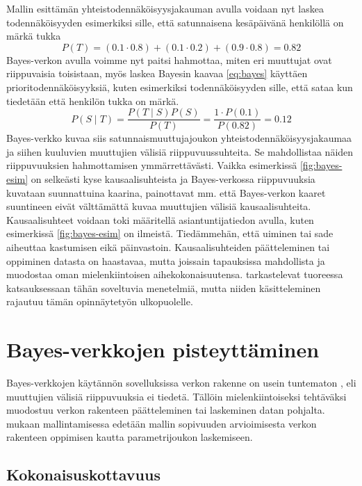 Mallin esittämän yhteistodennäköisyysjakauman avulla voidaan nyt laskea todennäköisyyden esimerkiksi sille, että satunnaisena kesäpäivänä henkilöllä on märkä tukka 
$$ 
    P(T) = (0.1\cdot0.8) + (0.1\cdot0.2) + (0.9\cdot0.8) = 0.82 
$$ 
Bayes-verkon avulla voimme nyt paitsi hahmottaa, miten eri muuttujat ovat riippuvaisia toisistaan, myös laskea Bayesin kaavaa \ref{eq:bayes} käyttäen prioritodennäköisyyksiä, kuten esimerkiksi todennäköisyyden sille, että sataa kun tiedetään että henkilön tukka on märkä. 
$$ 
  P(S \mid T) = \frac{P(T \mid S)P(S)}{P(T)} = \frac{1 \cdot P(0.1)}{P(0.82)} = 0.12    
$$ 
Bayes-verkko kuvaa siis satunnaismuuttujajoukon yhteistodennäköisyysjakaumaa ja siihen kuuluvien muuttujien välisiä riippuvuussuhteita. Se mahdollistaa näiden riippuvuuksien hahmottamisen ymmärrettävästi. Vaikka esimerkissä \ref{fig:bayes-esim} on selkeästi kyse kausaalisuhteista ja Bayes-verkossa riippuvuuksia kuvataan suunnattuina kaarina, painottavat mm. \citet{ruggeri_bayesian_2008, myllymaki_bayes-verkkojen_1998} että Bayes-verkon kaaret suuntineen eivät välttämättä kuvaa muuttujien välisiä kausaalisuhteita. Kausaalisuhteet voidaan toki määritellä asiantuntijatiedon avulla, kuten esimerkissä \ref{fig:bayes-esim} on ilmeistä. Tiedämmehän, että uiminen tai sade aiheuttaa kastumisen eikä päinvastoin. Kausaalisuhteiden päätteleminen tai oppiminen datasta on haastavaa, mutta joissain tapauksissa mahdollista ja muodostaa oman mielenkiintoisen aihekokonaisuutensa. \citet{vowels_dya_2022} tarkastelevat tuoreessa katsauksessaan tähän soveltuvia menetelmiä, mutta niiden käsitteleminen rajautuu tämän opinnäytetyön ulkopuolelle. 

\section{Bayes-verkkojen pisteyttäminen} 

Bayes-verkkojen käytännön sovelluksissa verkon rakenne on usein tuntematon \citep{ruggeri_bayesian_2008}, eli muuttujien välisiä riippuvuuksia ei tiedetä. Tällöin mielenkiintoiseksi tehtäväksi muodostuu verkon rakenteen päätteleminen tai laskeminen datan pohjalta. \citet{myllymaki_bayes-verkkojen_1998} mukaan mallintamisessa edetään mallin sopivuuden arvioimisesta verkon rakenteen oppimisen kautta parametrijoukon laskemiseen. 

\subsection{Kokonaisuskottavuus} 

